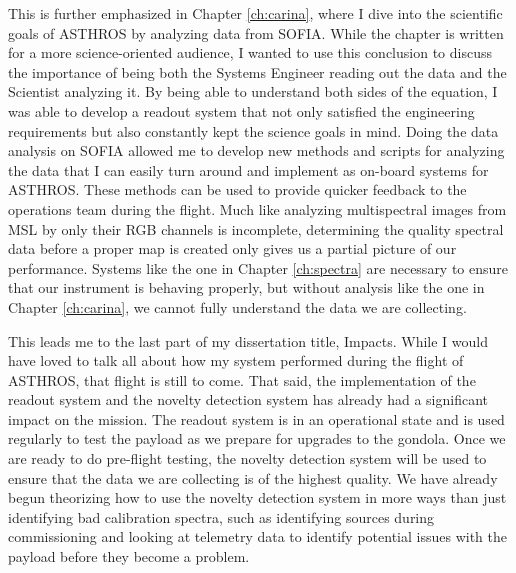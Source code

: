 This is further emphasized in Chapter \ref{ch:carina}, where I dive into the scientific goals of ASTHROS by analyzing data from SOFIA. 
While the chapter is written for a more science-oriented audience, I wanted to use this conclusion to discuss the importance of being both the Systems Engineer reading out the data and the Scientist analyzing it.
By being able to understand both sides of the equation, I was able to develop a readout system that not only satisfied the engineering requirements but also constantly kept the science goals in mind.
Doing the data analysis on SOFIA allowed me to develop new methods and scripts for analyzing the data that I can easily turn around and implement as on-board systems for ASTHROS.
These methods can be used to provide quicker feedback to the operations team during the flight. 
Much like analyzing multispectral images from MSL by only their RGB channels is incomplete, determining the quality spectral data before a proper map is created only gives us a partial picture of our performance.
Systems like the one in Chapter \ref{ch:spectra} are necessary to ensure that our instrument is behaving properly, but without analysis like the one in Chapter \ref{ch:carina}, we cannot fully understand the data we are collecting.

This leads me to the last part of my dissertation title, Impacts.
While I would have loved to talk all about how my system performed during the flight of ASTHROS, that flight is still to come.
That said, the implementation of the readout system and the novelty detection system has already had a significant impact on the mission.
The readout system is in an operational state and is used regularly to test the payload as we prepare for upgrades to the gondola.
Once we are ready to do pre-flight testing, the novelty detection system will be used to ensure that the data we are collecting is of the highest quality.
We have already begun theorizing how to use the novelty detection system in more ways than just identifying bad calibration spectra, such as identifying sources during commissioning and looking at telemetry data to identify potential issues with the payload before they become a problem.

